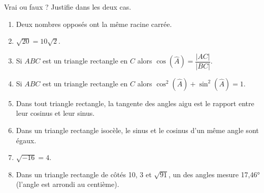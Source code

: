 %
%
    Vrai ou faux ? Justifie dans les deux cas.
    \begin{enumerate}
        \item Deux nombres opposés ont la même racine carrée.
        \item \(\sqrt{20}=10\sqrt{2}\).
        \item Si \(ABC\) est un triangle rectangle en \(C\) alors \(\cos\left(\widehat{A}\right) = \dfrac{|AC|}{|BC|}\).
        \item Si \(ABC\) est un triangle rectangle en \(C\) alors \(\cos^2\left(\widehat{A}\right) + \sin^2\left(\widehat{A}\right)=1\).
        \item Dans tout triangle rectangle, la tangente des angles aigu est le rapport entre leur cosinus et leur sinus.
        \item Dans un triangle rectangle isocèle, le sinus et le cosinus d'un même angle sont égaux.
        \item \(\sqrt{-16}=4\).
        \item Dans un triangle rectangle de côtés 10, 3 et \(\sqrt{91}\), un des angles mesure \ang{17,46} (l'angle est arrondi au centième).
    \end{enumerate}
